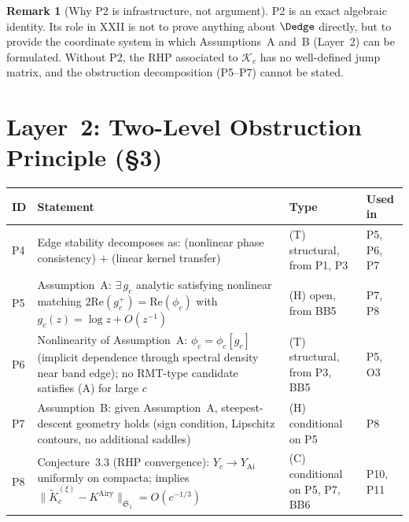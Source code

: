 \documentclass[12pt,a4paper]{amsart}
\theoremstyle{definition}
\newtheorem{remark}[theorem]{Remark}
\begin{document}
\begin{remark}[Why P2 is infrastructure, not argument]
P2 is an exact algebraic identity.
Its role in XXII is not to prove anything about $\Dedge$
directly, but to provide the coordinate system in which
Assumptions~A and~B (Layer~2) can be formulated.
Without P2, the RHP associated to $\mathcal{K}_c$ has no
well-defined jump matrix, and the obstruction decomposition
(P5--P7) cannot be stated.
\end{remark}

\section{Layer~2: Two-Level Obstruction Principle (\S3)}
\label{sec:L2}

\begin{center}
\renewcommand{\arraystretch}{1.35}
\begin{tabular}{l p{5.5cm} l l}
\toprule
\textbf{ID} & \textbf{Statement} & \textbf{Type} & \textbf{Used in} \\
\midrule
P4 & Edge stability decomposes as:
    (nonlinear phase consistency) $+$
    (linear kernel transfer)
    & (T) structural, from P1, P3
    & P5, P6, P7 \\
P5 & Assumption~A: $\exists\, g_c$ analytic
    satisfying nonlinear matching
    $2\mathrm{Re}(g_c^+) = \mathrm{Re}(\phi_c)$
    with $g_c(z)=\log z + O(z^{-1})$
    & (H) open, from BB5
    & P7, P8 \\
P6 & Nonlinearity of Assumption~A:
    $\phi_c = \phi_c[g_c]$ (implicit
    dependence through spectral density
    near band edge); no RMT-type
    candidate satisfies (A) for large $c$
    & (T) structural, from P3, BB5
    & P5, O3 \\
P7 & Assumption~B: given Assumption~A,
    steepest-descent geometry holds
    (sign condition, Lipschitz contours,
    no additional saddles)
    & (H) conditional on P5
    & P8 \\
P8 & Conjecture~3.3 (RHP convergence):
    $Y_c\to Y_{\mathrm{Ai}}$ uniformly
    on compacta; implies
    $\|\tilde{K}_c^{(\xi)}-K^{\mathrm{Airy}}\|_{\mathfrak{S}_1}=O(c^{-1/3})$
    & (C) conditional on P5, P7, BB6
    & P10, P11 \\
\bottomrule
\end{tabular}
\end{center}
\end{document}
